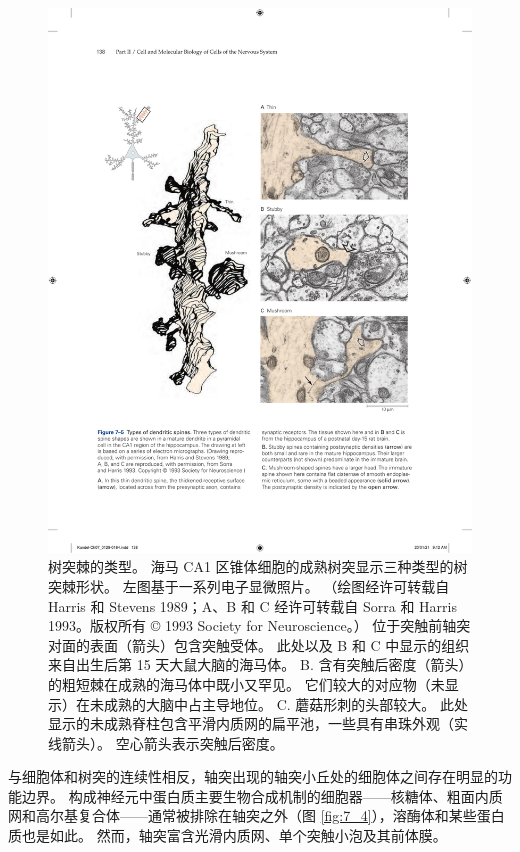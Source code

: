 \begin{figure}[htbp]
	\centering
	\includegraphics[width=1.0\linewidth]{chap07/fig_7_5}
	\caption{树突棘的类型。 海马 CA1 区锥体细胞的成熟树突显示三种类型的树突棘形状。 左图基于一系列电子显微照片。 （绘图经许可转载自 Harris 和 Stevens 1989；A、B 和 C 经许可转载自 Sorra 和 Harris 1993。版权所有 © 1993 Society for Neuroscience。） 位于突触前轴突对面的表面（箭头）包含突触受体。 此处以及 B 和 C 中显示的组织来自出生后第 15 天大鼠大脑的海马体。 B. 含有突触后密度（箭头）的粗短棘在成熟的海马体中既小又罕见。 它们较大的对应物（未显示）在未成熟的大脑中占主导地位。 C. 蘑菇形刺的头部较大。 此处显示的未成熟脊柱包含平滑内质网的扁平池，一些具有串珠外观（实线箭头）。 空心箭头表示突触后密度。}
	\label{fig:7_5}
\end{figure}


与细胞体和树突的连续性相反，轴突出现的轴突小丘处的细胞体之间存在明显的功能边界。 
构成神经元中蛋白质主要生物合成机制的细胞器——核糖体、粗面内质网和高尔基复合体——通常被排除在轴突之外（图 \ref{fig:7_4}），溶酶体和某些蛋白质也是如此。 
然而，轴突富含光滑内质网、单个突触小泡及其前体膜。


